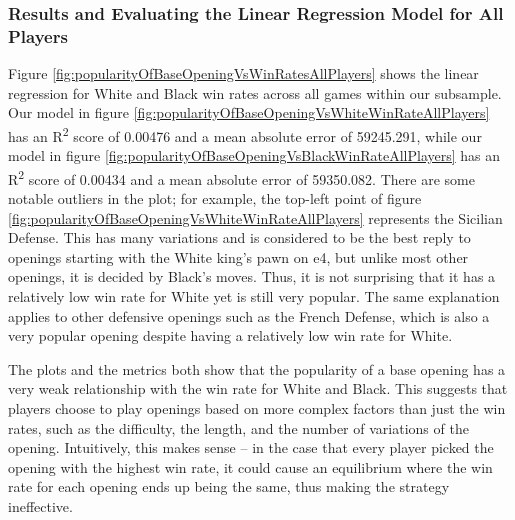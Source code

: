 \documentclass[a4paper, 11pt]{article}
\begin{document}
\subsubsection{Results and Evaluating the Linear Regression Model for All Players}
Figure \ref{fig:popularityOfBaseOpeningVsWinRatesAllPlayers} shows the linear regression for White and Black win rates across all games within our subsample. Our model in figure \ref{fig:popularityOfBaseOpeningVsWhiteWinRateAllPlayers} has an R\textsuperscript{2} score of 0.00476 and a mean absolute error of 59245.291, while our model in figure \ref{fig:popularityOfBaseOpeningVsBlackWinRateAllPlayers} has an R\textsuperscript{2} score of 0.00434 and a mean absolute error of 59350.082. There are some notable outliers in the plot; for example, the top-left point of figure \ref{fig:popularityOfBaseOpeningVsWhiteWinRateAllPlayers} represents the Sicilian Defense. This has many variations and is considered to be the best reply to openings starting with the White king's pawn on e4, but unlike most other openings, it is decided by Black's moves. Thus, it is not surprising that it has a relatively low win rate for White yet is still very popular. The same explanation applies to other defensive openings such as the French Defense, which is also a very popular opening despite having a relatively low win rate for White.

The plots and the metrics both show that the popularity of a base opening has a very weak relationship with the win rate for White and Black. This suggests that players choose to play openings based on more complex factors than just the win rates, such as the difficulty, the length, and the number of variations of the opening. Intuitively, this makes sense -- in the case that every player picked the opening with the highest win rate, it could cause an equilibrium where the win rate for each opening ends up being the same, thus making the strategy ineffective.
\end{document}
